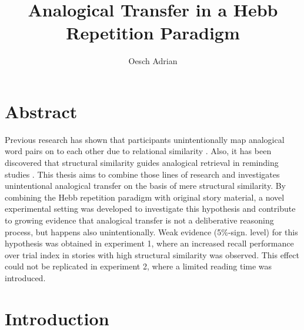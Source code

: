\documentclass[a4paper,man,natbib,floatsintext,import]{apa6}
\title{Analogical Transfer in a Hebb Repetition Paradigm}
\author{Oesch Adrian}
\affiliation{University of Zurich}
\begin{document}

\section*{Abstract}
Previous research has shown that participants unintentionally map analogical word pairs on to each other due to relational similarity \citep{Popov2015,Estes2006}. Also, it has been discovered that structural similarity guides analogical retrieval in reminding studies \citep{Wharton1996}. This thesis aims to combine those lines of research and investigates unintentional analogical transfer on the basis of mere structural similarity. By combining the Hebb repetition paradigm with original story material, a novel experimental setting was developed to investigate this hypothesis and contribute to growing evidence that analogical transfer is not a deliberative reasoning process, but happens also unintentionally. Weak evidence (5\%-sign. level) for this hypothesis was obtained in experiment 1, where an increased recall performance over trial index in stories with high structural similarity was observed. This effect could not be replicated in experiment 2, where a limited reading time was introduced.

\newpage
\tableofcontents

\newpage
\section{Introduction}
\end{document}

